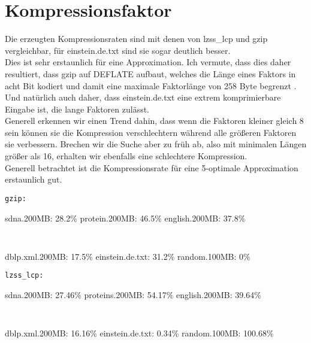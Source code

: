 \section{Kompressionsfaktor}
Die erzeugten Kompressionsraten sind mit denen von lzss\_lcp und gzip vergleichbar, für einstein.de.txt sind sie sogar deutlich besser.\\ 
Dies ist sehr erstaunlich für eine Approximation. Ich vermute, dass dies daher resultiert, dass gzip auf DEFLATE aufbaut, welches die Länge eines Faktors in acht Bit kodiert und damit eine maximale Faktorlänge von 258 Byte begrenzt \cite{deflate}. Und natürlich  auch daher, dass einstein.de.txt eine extrem komprimierbare Eingabe ist, die lange Faktoren zulässt.\\ 
Generell erkennen wir einen Trend dahin, dass wenn die Faktoren kleiner gleich 8 sein können sie die Kompression verschlechtern während alle größeren Faktoren sie verbessern.
Brechen wir die Suche aber zu früh ab, also mit minimalen Längen größer als 16, erhalten wir ebenfalls eine schlechtere Kompression.\\
Generell betrachtet ist die Kompressionsrate für eine 5-optimale Approximation erstaunlich gut.\\

\begin{multicols}{2}
	\texttt{gzip:}
	\begin{outline}
		\1[]
		\2[]sdna.200MB: 28.2\%
		\2[]protein.200MB: 46.5\%
		\2[]english.200MB: 37.8\%
	\end{outline}
\columnbreak
\texttt{  }
	\begin{outline}
		\1[]
			\2[]dblp.xml.200MB: 17.5\%
		\2[]einstein.de.txt: 31.2\%
		\2[]random.100MB: 0\%
	
	\end{outline}
\end{multicols}

\begin{multicols}{2}
	\texttt{lzss\_lcp:}
	\begin{outline}
		\1[]
		\2[] sdna.200MB:  27.46\%
		\2[] proteins.200MB: 54.17\%
		\2[] english.200MB: 39.64\%
	\end{outline}
	\columnbreak
	\texttt{   }
	\begin{outline}
		\1[]
			\2[] dblp.xml.200MB: 16.16\%
		\2[] einstein.de.txt: 0.34\%
		\2[] random.100MB: 100.68\%
	
	\end{outline}
\end{multicols}

